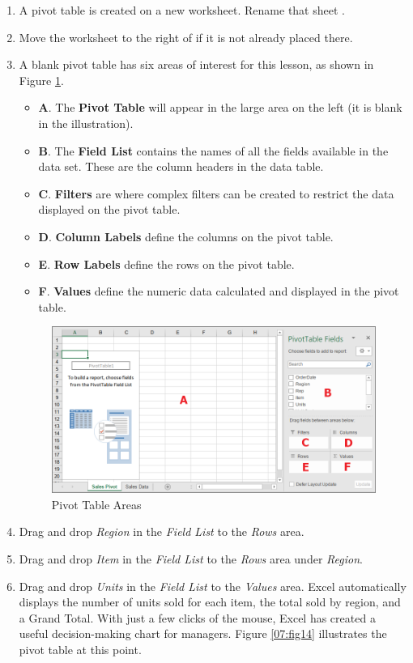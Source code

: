 \begin{enumbox}
\begin{enumerate}
		\item A pivot table is created on a new worksheet. Rename that sheet .
		\item Move the  worksheet to the right of  if it is not already placed there.
		\item A blank pivot table has six areas of interest for this lesson, as shown in Figure \ref{07:fig13}.
	
		\begin{itemize}
			\item \textbf{A}. The \textbf{Pivot Table} will appear in the large area on the left (it is blank in the illustration).
			\item \textbf{B}. The \textbf{Field List} contains the names of all the fields available in the data set. These are the column headers in the data table.
			\item \textbf{C}. \textbf{Filters} are where complex filters can be created to restrict the data displayed on the pivot table.
			\item \textbf{D}. \textbf{Column Labels} define the columns on the pivot table.
			\item \textbf{E}. \textbf{Row Labels} define the rows on the pivot table.
			\item \textbf{F}. \textbf{Values} define the numeric data calculated and displayed in the pivot table.
		\end{itemize}

		\begin{figure}[H]
			\centering
			\includegraphics[width=\maxwidth{.95\linewidth}]{gfx/ch07_fig13}
			\caption{Pivot Table Areas}
			\label{07:fig13}
		\end{figure}

		\item Drag and drop \textit{Region} in the \textit{Field List} to the \textit{Rows} area. 
		\item Drag and drop \textit{Item} in the \textit{Field List} to the \textit{Rows} area under \textit{Region}.
		\item Drag and drop \textit{Units} in the \textit{Field List} to the \textit{Values} area. Excel automatically displays the number of units sold for each item,  the total sold by region, and a Grand Total. With just a few clicks of the mouse, Excel has created a useful decision-making chart for managers. Figure \ref{07:fig14} illustrates the pivot table at this point.


\end{enumerate}
\end{enumbox}
